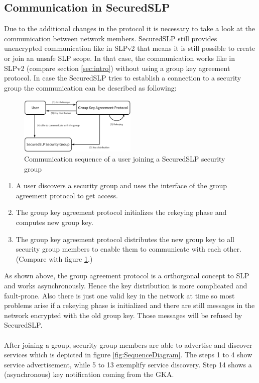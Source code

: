 \subsection{Communication in SecuredSLP}
Due to the additional changes in the protocol it is necessary to take a look at the communication between network members. SecuredSLP still provides unencrypted communication like in SLPv2 that means it is still possible to create or join an unsafe SLP scope. In that case, the communication works like in SLPv2 (compare section \ref{sec:intro}) without using a group key agreement protocol. In case the SecuredSLP tries to establish a connection to a security group the communication can be described as following:
\begin{figure}[!h]
\centering\includegraphics[width=0.5\textwidth]{Images/sSLP_join}
\caption{Communication sequence of a user joining a SecuredSLP security group}
\label{fig:sslp_join}
\end{figure}
\begin{enumerate}
  \item A user discovers a security group and uses the interface of the group agreement protocol to get access.
  \item The group key agreement protocol initializes the rekeying phase and computes new group key.
  \item The group key agreement protocol distributes the new group key to all security group members to enable them to communicate with each other. (Compare with figure \ref{fig:sslp_join}.)
\end{enumerate}
As shown above, the group agreement protocol is a orthorgonal concept to SLP and works asynchronously. Hence the key distribution is more complicated and fault-prone. Also there is just one valid key in the network at time so most problems arise if a rekeying phase is initialized and there are still messages in the network encrypted with the old group key. Those messages will be refused by SecuredSLP.\\\\
After joining a group, security group members are able to advertise and discover services which is depicted in figure \ref{fig:SequenceDiagram}. The steps 1 to 4 show service advertisement, while 5 to 13 exemplify service discovery. Step 14 shows a (asynchronous) key notification coming from the GKA.
